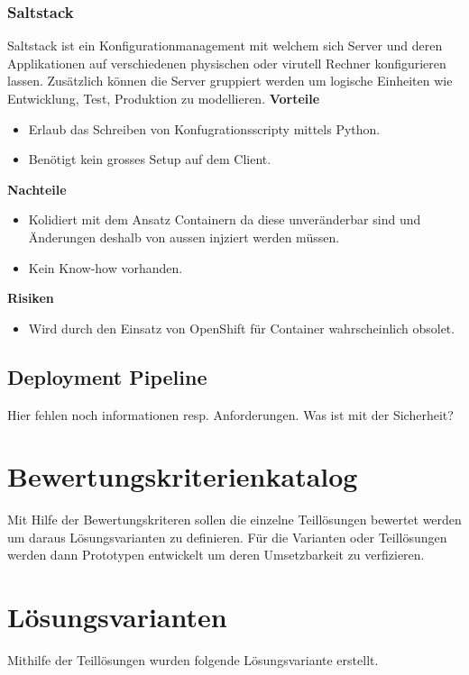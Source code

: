 \subsubsection{Saltstack}

Saltstack ist ein Konfigurationmanagement mit welchem sich Server und deren Applikationen auf verschiedenen physischen oder virutell Rechner konfigurieren lassen. Zusätzlich können die Server gruppiert werden um logische Einheiten wie Entwicklung, Test, Produktion zu modellieren.\newline
\newline
\textbf{Vorteile}
\begin{itemize}
	\item Erlaub das Schreiben von Konfugrationsscripty mittels Python.
	\item Benötigt kein grosses Setup auf dem Client.
\end{itemize}
\textbf{Nachteile}
\begin{itemize}
	\item Kolidiert mit dem Ansatz Containern da diese unveränderbar sind und Änderungen deshalb von aussen injziert werden müssen.
	\item Kein Know-how vorhanden.
\end{itemize}
\textbf{Risiken}
\begin{itemize}
	\item Wird durch den Einsatz von OpenShift für Container wahrscheinlich obsolet.
\end{itemize}

\subsection{Deployment Pipeline}

Hier fehlen noch informationen resp. Anforderungen. Was ist mit der Sicherheit?

\section{Bewertungskriterienkatalog}

Mit Hilfe der Bewertungskriteren sollen die einzelne Teillösungen bewertet werden um daraus Lösungsvarianten zu definieren. Für die Varianten oder Teillösungen werden dann Prototypen entwickelt um deren Umsetzbarkeit zu verfizieren.

\section{Lösungsvarianten}

Mithilfe der Teillösungen wurden folgende Lösungsvariante erstellt. 



